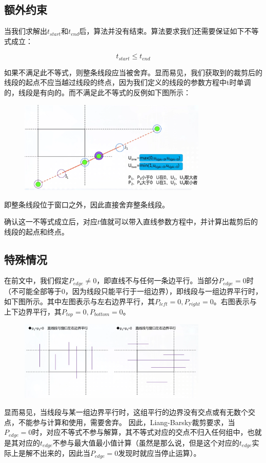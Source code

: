 \subsection{额外约束}

当我们求解出$t_{start}$和$t_{end}$后，算法并没有结束。算法要求我们还需要保证如下不等式成立：

\begin{equation}
t_{start} \leq t_{end}
\end{equation}

如果不满足此不等式，则整条线段应当被舍弃。显而易见，我们获取到的裁剪后的线段的起点不应当越过线段的终点，因为我们定义的线段的参数方程中t时单调的，线段是有向的。而不满足此不等式的反例如下图所示：

\begin{figure}[H]
\centering
\includegraphics[width=0.8\textwidth,keepaspectratio]{imgs/lb-clip-invalid.png}
\end{figure}

即整条线段位于窗口之外，因此直接舍弃整条线段。

确认这一不等式成立后，对应$t$值就可以带入直线参数方程中，并计算出裁剪后的线段的起点和终点。

\subsection{特殊情况}

在前文中，我们假定$P_{edge} \neq 0$，即直线不与任何一条边平行。当部分$P_{edge}=0$时（不可能全部等于0，因为线段只能平行于一组边界），即线段与一组边界平行时，如下图所示。其中左图表示与左右边界平行，其$P_{left}=0,P_{right}=0$。右图表示与上下边界平行，其$P_{top}=0,P_{bottom}=0$。

\begin{figure}[H]
\centering
\includegraphics[width=0.8\textwidth,keepaspectratio]{imgs/lb-clip-special.png}
\end{figure}

显而易见，当线段与某一组边界平行时，这组平行的边界没有交点或有无数个交点，不能参与计算和使用，需要舍弃。
因此，Liang-Barsky裁剪要求，当$P_{edge}=0$时，对应不等式不参与解算，其不等式对应的交点不归入任何组中，也就是其对应的$t_{edge}$不参与最大值最小值计算（虽然是那么说，但是这个对应的$t_{edge}$实际上是解不出来的，因此当$P_{edge}=0$发现时就应当停止运算）。



